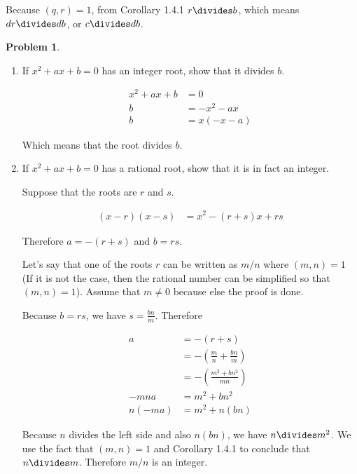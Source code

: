\documentclass{article}
\theoremstyle{definition}
\newtheorem{problem}{Problem}
\begin{document}
  Because $(q, r) = 1$, from Corollary 1.4.1 $r \divides b$, which means
  $dr \divides db$, or $c \divides db$.
  
  \begin{problem}
    ~
  \end{problem}
  
  \begin{enumerate}[label=\alph*)]
    \item If $x^2 + ax + b = 0$ has an integer root, show that it divides $b$.
    
    \begin{align*}
      x^2 + ax + b &= 0 \\
      b &= -x^2 - ax \\
      b &= x(-x - a)
    \end{align*}
    
    Which means that the root divides $b$.
    
    \item If $x^2 + ax + b = 0$ has a rational root, show that it is in fact an integer.
    
    Suppose that the roots are $r$ and $s$.
    
    \begin{align*}
      (x - r) (x - s) &= x^2 -(r + s)x + rs
    \end{align*}
    
    Therefore $a = -(r + s)$ and $b = rs$. 
    
    Let's say that one of the roots $r$
    can be written as $m/n$ where $(m, n) = 1$ (If it is not the case, then the rational number
    can be simplified so that $(m, n) = 1$). Assume that $m \neq 0$ because else the proof
    is done.
    
    Because $b = rs$, we have $s = \frac{bn}{m}$. Therefore
    
    \begin{align*}
      a &= -(r + s) \\
        &= -\left(\frac{m}{n} + \frac{bn}{m}\right) \\
        &= -\left(\frac{m^2 + bn^2}{mn}\right) \\
      -mna &= m^2 + bn^2 \\
      n(-ma) &= m^2 + n(bn)
    \end{align*}
    
    Because $n$ divides the left side and also $n(bn)$, we have $n \divides m^2$. We use
    the fact that $(m, n) = 1$ and Corollary 1.4.1 to conclude that $n \divides m$. Therefore
    $m/n$ is an integer.
    
  \end{enumerate}
\end{document}
